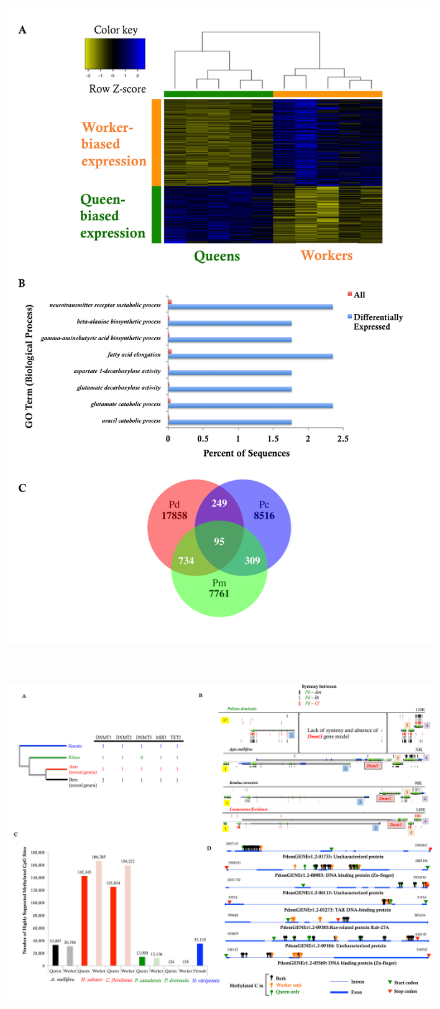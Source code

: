\begin{figure}[h]
\centering
\includegraphics[width=6in]{Assets/Graphics/Pdom/figure-2}
\caption{~}
\label{Fig:Pdom2}
\end{figure}

\begin{figure}
\includegraphics[width=8in]{Assets/Graphics/Pdom/figure-3}
\centering
\caption{~}
\label{Fig:Pdom3}
\end{figure}
